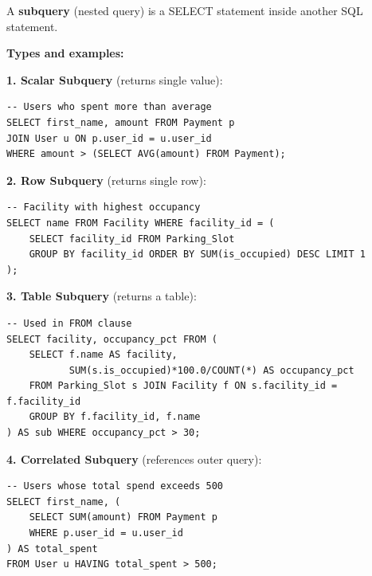 \documentclass[12pt,a4paper]{article}
\begin{document}
\begin{questionbox}
\end{questionbox}
\begin{answerbox}
A \textbf{subquery} (nested query) is a SELECT statement inside another SQL statement.

\textbf{Types and examples:}

\textbf{1. Scalar Subquery} (returns single value):
\begin{lstlisting}
-- Users who spent more than average
SELECT first_name, amount FROM Payment p
JOIN User u ON p.user_id = u.user_id
WHERE amount > (SELECT AVG(amount) FROM Payment);
\end{lstlisting}

\textbf{2. Row Subquery} (returns single row):
\begin{lstlisting}
-- Facility with highest occupancy
SELECT name FROM Facility WHERE facility_id = (
    SELECT facility_id FROM Parking_Slot
    GROUP BY facility_id ORDER BY SUM(is_occupied) DESC LIMIT 1
);
\end{lstlisting}

\textbf{3. Table Subquery} (returns a table):
\begin{lstlisting}
-- Used in FROM clause
SELECT facility, occupancy_pct FROM (
    SELECT f.name AS facility,
           SUM(s.is_occupied)*100.0/COUNT(*) AS occupancy_pct
    FROM Parking_Slot s JOIN Facility f ON s.facility_id = f.facility_id
    GROUP BY f.facility_id, f.name
) AS sub WHERE occupancy_pct > 30;
\end{lstlisting}

\textbf{4. Correlated Subquery} (references outer query):
\begin{lstlisting}
-- Users whose total spend exceeds 500
SELECT first_name, (
    SELECT SUM(amount) FROM Payment p
    WHERE p.user_id = u.user_id
) AS total_spent
FROM User u HAVING total_spent > 500;
\end{lstlisting}
\end{answerbox}
\end{document}
